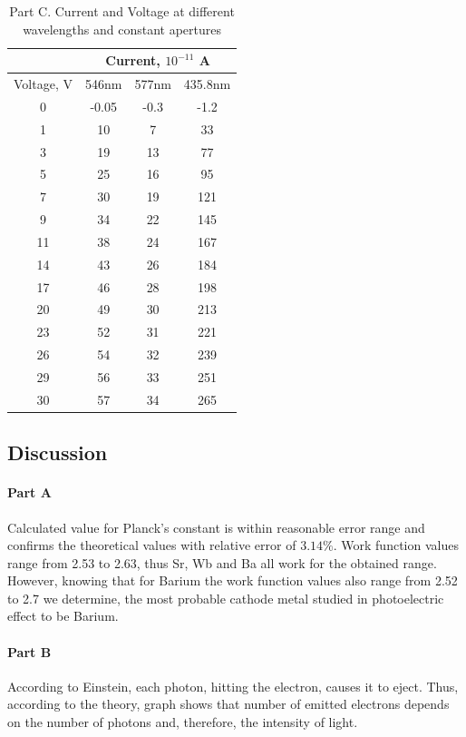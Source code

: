 \documentclass{article}
\begin{document}
 \begin{table}
 \centering
   
 \begin{tabular}{ | c | c | c | c | }
  \caption{Part C. Current and Voltage at different wavelengths and constant apertures}
\hline
    & \multicolumn{3}{c}{Current, $10^{-11}$ A}\\ \hline
	Voltage, V & 546nm & 577nm & 435.8nm \\ \hline
	0 & -0.05 & -0.3 & -1.2 \\ \hline
	1 & 10 & 7 & 33 \\ \hline
	3 & 19 & 13 & 77 \\ \hline
	5 & 25 & 16 & 95 \\ \hline
	7 & 30 & 19 & 121 \\ \hline
	9 & 34 & 22 & 145 \\ \hline
	11 & 38 & 24 & 167 \\ \hline
	14 & 43 & 26 & 184 \\ \hline
	17 & 46 & 28 & 198 \\ \hline
	20 & 49 & 30 & 213 \\ \hline
	23 & 52 & 31 & 221 \\ \hline
	26 & 54 & 32 & 239 \\ \hline
	29 & 56 & 33 & 251 \\ \hline
	30 & 57 & 34 & 265 \\ \hline
\end{tabular}
\end{table}





\newpage
\subsection{Discussion}
\paragraph{Part A} Calculated value for Planck's constant is within reasonable error range and confirms the theoretical values with relative error of $3.14\%$. Work function values range from 2.53 to 2.63, thus Sr, Wb and Ba all work for the obtained range. However, knowing that for Barium the work function values also range from 2.52 to 2.7 we determine, the most probable cathode metal studied in photoelectric effect to be Barium.
\paragraph{Part B} According to Einstein, each photon, hitting the electron, causes it to eject. Thus, according to the theory, graph shows that number of emitted electrons depends on the number of photons and, therefore, the intensity of light.
\end{document}
